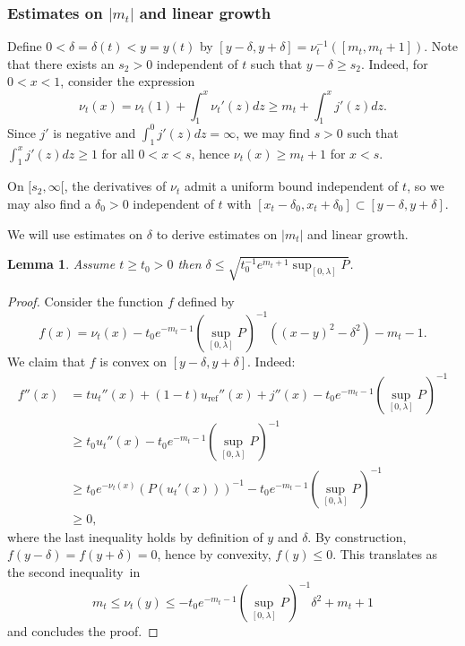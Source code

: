 \documentclass[JEP,XML,SOM,Unicode, NoEqCountersInSection, NoFloatCountersInSection]{cedram}
\theoremstyle{plain}
\newtheorem{lem}[thm]{Lemma}
\theoremstyle{definition}
\begin{document}
\subsubsection{Estimates on $|m_t|$ and linear growth}

Define $0<\delta=\delta(t)<y=y(t)$ by $[y-\delta,y+\delta]=\nu_t^{-1}([m_t,m_t+1])$.
Note that there exists an $s_2>0$ independent of $t$ such that $y-\delta\geq s_2$.
Indeed, for $0<x<1$, consider the expression
\[ \nu_t(x) = \nu_t(1) + \int_1^x\nu_t'(z)dz \geq m_t+\int_1^x j'(z)dz. \]
Since $j'$ is negative and $\int_1^0 j'(z)dz=\infty$,
we may find $s>0$ such that $\int_1^x j'(z)dz\geq 1$ for all
$0<x<s$, hence $\nu_t(x)\geq m_t+1$ for $x<s$.

On $[s_2,\infty[$, the derivatives of $\nu_t$ admit a uniform bound independent
of $t$, so we may also find a $\delta_0>0$ independent of $t$ with
$[x_t-\delta_0,x_t+\delta_0]\subset [y-\delta,y+\delta]$.

We will use estimates on $\delta$ to derive estimates on $|m_t|$ and linear growth.

\begin{lem}
\label{lem_estimate_delta}
Assume $t\geq t_0>0$ then $\delta \leq \sqrt{t_0^{-1}e^{m_t+1}\sup_{[0,\lambda]}P}$.
\end{lem}

\begin{proof}
Consider the function $f$ defined by
\begin{equation*}
f(x)=\nu_t(x)-t_0e^{-m_t-1}(\sup_{[0,\lambda]}P)^{-1}\left((x-y)^2-\delta^2\right)-m_t-1.
\end{equation*}
We claim that $f$ is convex on $[y-\delta,y+\delta]$. Indeed:
\begin{align*}
f''(x)&=tu_t''(x)+(1-t)u_{\mathrm{ref}}''(x)+j''(x)-t_0e^{-m_t-1}(\sup_{[0,\lambda]}P)^{-1} \\
&\geq t_0u_t''(x)-t_0e^{-m_t-1}(\sup_{[0,\lambda]}P)^{-1} \\
&\geq t_0e^{-\nu_t(x)}(P(u_t'(x)))^{-1}-t_0e^{-m_t-1}(\sup_{[0,\lambda]}P)^{-1} \\
&\geq 0,
\end{align*}
where the last inequality holds by definition of $y$ and $\delta$.
By construction, $f(y-\delta)=f(y+\delta)=0$, hence by convexity, $f(y)\leq 0$.
This translates as the second inequality~in
\begin{equation*}
m_t\leq\nu_t(y)\leq -t_0e^{-m_t-1}(\sup_{[0,\lambda]}P)^{-1}\delta^2+m_t+1
\end{equation*}
and concludes the proof.
\end{proof}
\end{document}
